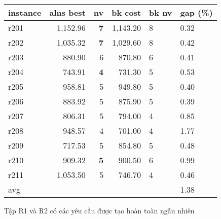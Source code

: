   \begin{table}[caption={Kết quả đo với tập Solomon R2}, label=exp:solomonR2]
    \centering
    \begin{tabular}{lrrrll}
    \hline
    instance & \multicolumn{1}{l}{alns best} & \multicolumn{1}{l}{nv} & \multicolumn{1}{l}{bk cost} & bk nv & gap (\%) \\ \hline
    r201 & 1,152.96 & \textbf{7} & 1,143.20 & 8 & 0.32 \\ 
    r202 & 1,035.32 & \textbf{7} & 1,029.60 & 8 & 0.42 \\ \hline
    r203 & 880.90 & 6 & 870.80 & 6 & 0.41 \\ \hline
    r204 & 743.91 & \textbf{4} & 731.30 & 5 & 0.53 \\ \hline
    r205 & 958.81 & 5 & 949.80 & 5 & 0.40 \\ \hline
    r206 & 883.92 & 5 & 875.90 & 5 & 0.39 \\ \hline
    r207 & 806.31 & 5 & 794.00 & 4 & 0.85 \\ \hline
    r208 & 948.57 & 4 & 701.00 & 4 & 1.77 \\ \hline
    r209 & 717.53 & 5 & 854.80 & 5 & 0.48 \\ \hline
    r210 & 909.32 & \textbf{5} & 900.50 & 6 & 0.99 \\ \hline
    r211 & 1,053.50 & 5 & 746.70 & 4 & 0.46 \\ \hline
    avg &  &  &  &  & 1.38 \\ \hline
    \end{tabular}
  \end{table}

  Tập R1 và R2 có các yêu cầu được tạo hoàn toàn ngẫu nhiên 


